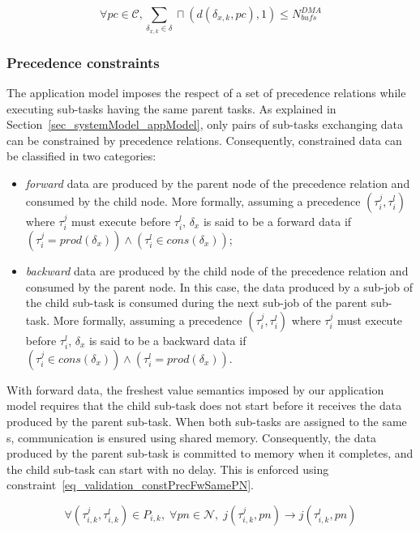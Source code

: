 \documentclass[main.tex]{subfiles}
\begin{document}
\begin{equation}
    \label{eq_validation_consPcUtilDDMA}
    \forall pc \in \mathcal{C} , 
    \sum_{\delta_{x,k} \in \delta} \sqcap ( d(\delta_{x,k} , pc) , 1 ) \leq N_{bufs}^{DMA}
\end{equation}

\subsubsection{Precedence constraints}
The application model imposes the respect of a set of precedence relations
while executing sub-tasks having the same parent tasks. As explained in
Section~\ref{sec_systemModel_appModel}, only pairs of sub-tasks exchanging data
can be constrained by precedence relations. Consequently, constrained data can
be classified in two categories:
\begin{itemize}
    \item \emph{forward} data are produced by the parent node of the precedence
        relation and consumed by the child node. More formally, assuming a
        precedence $(\tau_i^j , \tau_i^l )$ where $\tau_i^j$ must execute
        before $\tau_i^l$, $\delta_x$ is said to be a forward data if
        $(\tau_i^j = prod(\delta_x)) \land (\tau_i^l \in cons(\delta_x))$;
    \item \emph{backward} data are produced by the child node of the precedence
        relation and consumed by the parent node. In this case, the data
        produced by a sub-job of the child sub-task is consumed during the next
        sub-job of the parent sub-task. More formally, assuming a precedence
        $(\tau_i^j , \tau_i^l )$ where $\tau_i^j$ must execute before
        $\tau_i^l$, $\delta_x$ is said to be a backward data if $(\tau_i^j \in
        cons(\delta_x)) \land (\tau_i^l = prod(\delta_x))$.
\end{itemize}

With forward data, the freshest value semantics imposed by our application
model requires that the child sub-task does not start before it receives the
data produced by the parent sub-task. When both sub-tasks are assigned to the
same \PN{}s, communication is ensured using shared memory. Consequently, the
data produced by the parent sub-task is committed to memory when it completes,
and the child sub-task can start with no delay. This is enforced using
constraint~\ref{eq_validation_constPrecFwSamePN}.

\begin{equation}
    \label{eq_validation_constPrecFwSamePN}
    \forall (\tau_{i,k}^j , \tau_{i,k}^l) \in P_{i,k}, \; \forall pn \in \mathcal{N} , \; 
    j( \tau_{i,k}^j , pn ) \to j( \tau_{i,k}^l , pn )
\end{equation}
\end{document}
